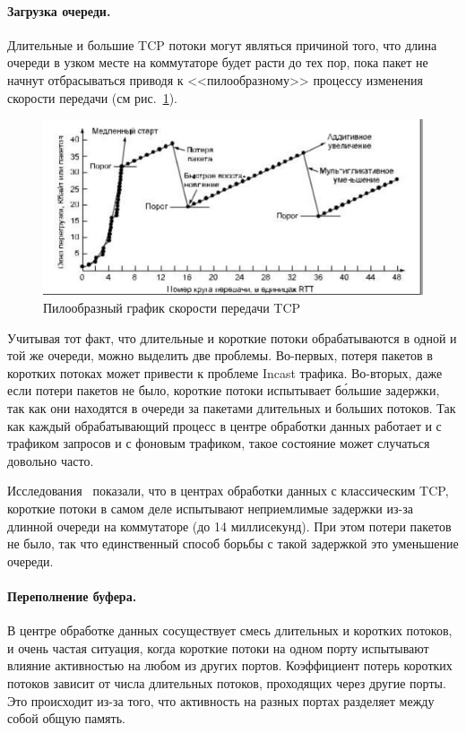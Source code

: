 \documentclass[14pt, a4paper,oneside]{extarticle}
\begin{document}
\paragraph{Загрузка очереди.}
Длительные и большие TCP потоки могут являться причиной того, что длина очереди в узком месте на коммутаторе будет расти до тех пор, пока пакет не начнут отбрасываться приводя к <<пилообразному>> процессу изменения скорости передачи (см рис.~\ref{tcp_sawtooth}).
\begin{figure}
	\includegraphics[width=\linewidth]{tcp_sawtooth.jpg}
	\caption{Пилообразный график скорости передачи TCP}
	\label{tcp_sawtooth}
\end{figure}
Учитывая тот факт, что длительные и короткие потоки обрабатываются в одной и той же очереди, можно выделить две проблемы. Во-первых, потеря пакетов в коротких потоках может привести к проблеме Incast трафика. Во-вторых, даже если потери пакетов не было, короткие потоки испытывает б\'{о}льшие задержки, так как они находятся в очереди за пакетами длительных и больших потоков. Так как каждый обрабатывающий процесс в центре обработки данных работает и с трафиком запросов и с фоновым трафиком, такое состояние может случаться довольно часто.

Исследования~\cite{dctcp} показали, что в центрах обработки данных с классическим TCP, короткие потоки в самом деле испытывают неприемлимые задержки из-за длинной очереди на коммутаторе (до 14 миллисекунд). При этом потери пакетов не было, так что единственный способ борьбы с такой задержкой  это уменьшение очереди.

\paragraph{Переполнение буфера.}
В центре обработке данных сосуществует смесь длительных и коротких потоков, и очень частая ситуация, когда короткие потоки на одном порту испытывают влияние активностью на любом из других портов. Коэффициент потерь коротких потоков зависит от числа длительных потоков, проходящих через другие порты. Это происходит из-за того, что активность на разных портах разделяет между собой общую память.
\end{document}
